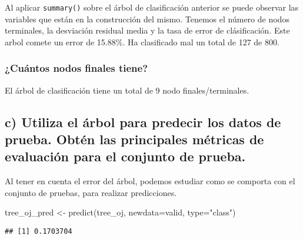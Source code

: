 \documentclass[
]{article}
\newenvironment{Shaded}{\begin{snugshade}}{\end{snugshade}}
\newcommand{\AttributeTok}[1]{\textcolor[rgb]{0.77,0.63,0.00}{#1}}
\newcommand{\FunctionTok}[1]{\textcolor[rgb]{0.00,0.00,0.00}{#1}}
\newcommand{\NormalTok}[1]{#1}
\newcommand{\OtherTok}[1]{\textcolor[rgb]{0.56,0.35,0.01}{#1}}
\newcommand{\SpecialCharTok}[1]{\textcolor[rgb]{0.00,0.00,0.00}{#1}}
\newcommand{\StringTok}[1]{\textcolor[rgb]{0.31,0.60,0.02}{#1}}
\begin{document}
Al aplicar \texttt{summary()} sobre el árbol de clasificación anterior
se puede observar las variables que están en la construcción del mismo.
Tenemos el número de nodos terminales, la desviación residual media y la
tasa de error de clásificación. Este arbol comete un error de 15.88\%.
Ha clasificado mal un total de 127 de 800.

\hypertarget{cuuxe1ntos-nodos-finales-tiene}{%
\subsubsection{¿Cuántos nodos finales
tiene?}\label{cuuxe1ntos-nodos-finales-tiene}}

El árbol de clasificación tiene un total de 9 nodo finales/terminales.

\hypertarget{c-utiliza-el-uxe1rbol-para-predecir-los-datos-de-prueba.-obtuxe9n-las-principales-muxe9tricas-de-evaluaciuxf3n-para-el-conjunto-de-prueba.}{%
\subsection{c) Utiliza el árbol para predecir los datos de prueba. Obtén
las principales métricas de evaluación para el conjunto de
prueba.}\label{c-utiliza-el-uxe1rbol-para-predecir-los-datos-de-prueba.-obtuxe9n-las-principales-muxe9tricas-de-evaluaciuxf3n-para-el-conjunto-de-prueba.}}

Al tener en cuenta el error del árbol, podemos estudiar como se comporta
con el conjunto de pruebas, para realizar predicciones.

\begin{Shaded}
\begin{Highlighting}[]
\NormalTok{tree\_oj\_pred }\OtherTok{\textless{}{-}} \FunctionTok{predict}\NormalTok{(tree\_oj, }\AttributeTok{newdata=}\NormalTok{valid, }\AttributeTok{type=}\StringTok{"class"}\NormalTok{)}
\end{Highlighting}
\end{Shaded}

\begin{Shaded}
\end{Shaded}

\begin{verbatim}
## [1] 0.1703704
\end{verbatim}
\end{document}
